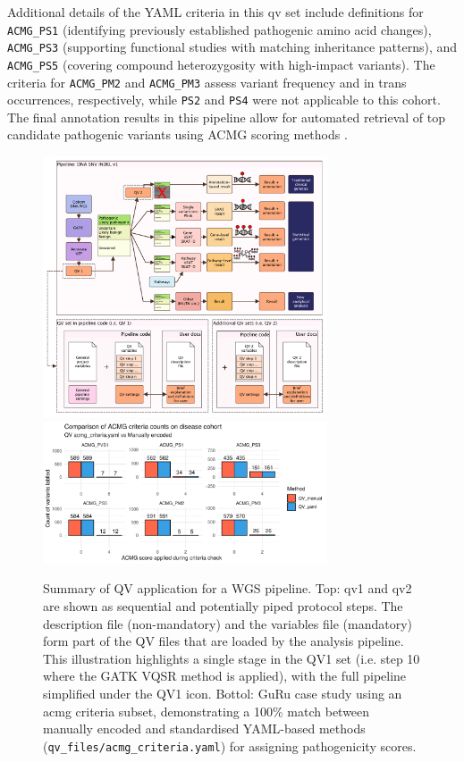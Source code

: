 Additional details of the YAML criteria in this \ac{qv} set include definitions for \texttt{ACMG\_PS1} (identifying previously established pathogenic amino acid changes), \texttt{ACMG\_PS3} (supporting functional studies with matching inheritance patterns), and \texttt{ACMG\_PS5} (covering compound heterozygosity with high-impact variants). The criteria for \texttt{ACMG\_PM2} and \texttt{ACMG\_PM3} assess variant frequency and in trans occurrences, respectively, while \texttt{PS2} and \texttt{PS4} were not applicable to this cohort.
The final annotation results in this pipeline allow for automated retrieval of top candidate pathogenic variants using ACMG scoring methods \cite{richards2015standards, tavtigian2020fitting}.

\begin{figure}[!h]
    \centering
   \includegraphics[width=0.75\textwidth]{./images/qv_pipeline_with_file_vcurrent.pdf}
   \includegraphics[width=0.75\textwidth]{./images/Guru_singlecase_validation_of_yaml_vs_manual.pdf}
    \caption{Summary of QV application for a WGS pipeline. Top: \ac{qv}1 and \ac{qv}2 are shown as sequential and potentially piped protocol steps. The description file (non-mandatory) and the variables file (mandatory) form part of the QV files that are loaded by the analysis pipeline. This illustration highlights a single stage in the QV1 set (i.e. step 10 where the GATK VQSR method is applied), with the full pipeline simplified under the QV1 icon.
    Bottol: GuRu case study using an \ac{acmg} criteria subset, demonstrating a 100\% match between manually encoded and standardised YAML-based methods (\texttt{qv\_files/acmg\_criteria.yaml}) for assigning pathogenicity scores.}
    \label{fig:qv_pipeline_with_file_vcurrent_guru_case_study_result}
\end{figure}


